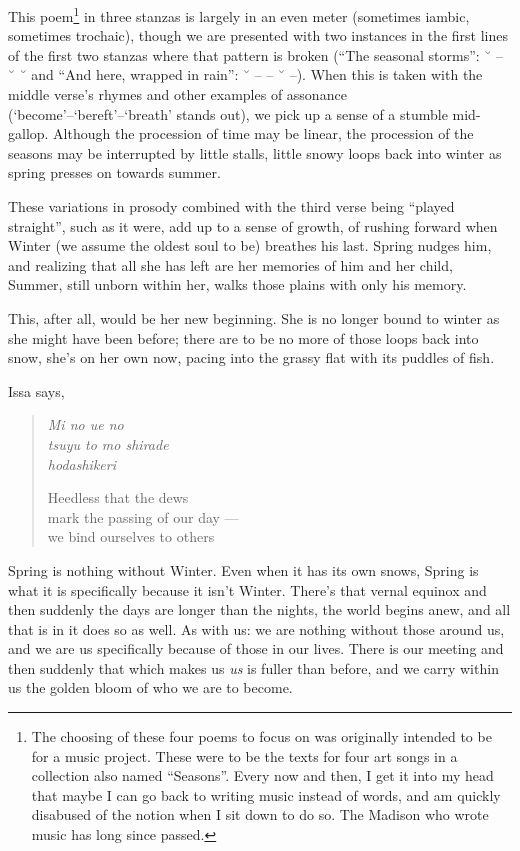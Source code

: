 \documentclass[12pt,oneside]{memoir}
\begin{document}
This poem\footnote{The choosing of these four poems to focus on was originally intended to be for a music project. These were to be the texts for four art songs in a collection also named ``Seasons''. Every now and then, I get it into my head that maybe I can go back to writing music instead of words, and am quickly disabused of the notion when I sit down to do so. The Madison who wrote music has long since passed.} in three stanzas is largely in an even meter (sometimes iambic, sometimes trochaic), though we are presented with two instances in the first lines of the first two stanzas where that pattern is broken (``The seasonal storms'': ˘ -- ˘ ˘ and ``And here, wrapped in rain'': ˘ -- -- ˘ --). When this is taken with the middle verse's rhymes and other examples of assonance (`become'--`bereft'--`breath' stands out), we pick up a sense of a stumble mid-gallop. Although the procession of time may be linear, the procession of the seasons may be interrupted by little stalls, little snowy loops back into winter as spring presses on towards summer.

These variations in prosody combined with the third verse being ``played straight'', such as it were, add up to a sense of growth, of rushing forward when Winter (we assume the oldest soul to be) breathes his last. Spring nudges him, and realizing that all she has left are her memories of him and her child, Summer, still unborn within her, walks those plains with only his memory.

This, after all, would be her new beginning. She is no longer bound to winter as she might have been before; there are to be no more of those loops back into snow, she's on her own now, pacing into the grassy flat with its puddles of fish.

Issa says,

\begin{verse}
\emph{Mi no ue no} \\
\emph{tsuyu to mo shirade} \\
\emph{hodashikeri}

Heedless that the dews \\
mark the passing of our day --- \\
we bind ourselves to others

\parencite[11]{issa}
\end{verse}

Spring is nothing without Winter. Even when it has its own snows, Spring is what it is specifically because it isn't Winter. There's that vernal equinox and then suddenly the days are longer than the nights, the world begins anew, and all that is in it does so as well. As with us: we are nothing without those around us, and we are us specifically because of those in our lives. There is our meeting and then suddenly that which makes us \emph{us} is fuller than before, and we carry within us the golden bloom of who we are to become.
\end{document}
